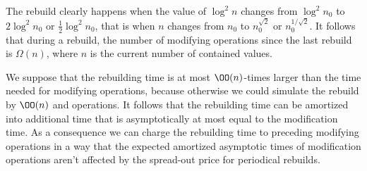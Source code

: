The rebuild clearly happens when the value of $\log^2 n$ changes from $\log^2 n_0$ to $2 \log^2 n_0$ or $\frac 1 2 \log^2 n_0$, that is when $n$ changes from $n_0$ to $n_0^{\sqrt 2}$ or $n_0^{1 / \sqrt 2}$.
It follows that during a rebuild, the number of modifying operations since the last rebuild is $\Omega(n)$, where $n$ is the current number of contained values.

We suppose that the rebuilding time is at most $\OO(n)$-times larger than the time needed for modifying operations, because otherwise we could simulate the rebuild by $\OO(n)$  and  operations.
It follows that the rebuilding time can be amortized into additional time that is asymptotically at most equal to the modification time.
As a consequence we can charge the rebuilding time to preceding modifying operations in a way that the expected amortized asymptotic times of modification operations aren't affected by the spread-out price for periodical rebuilds.
